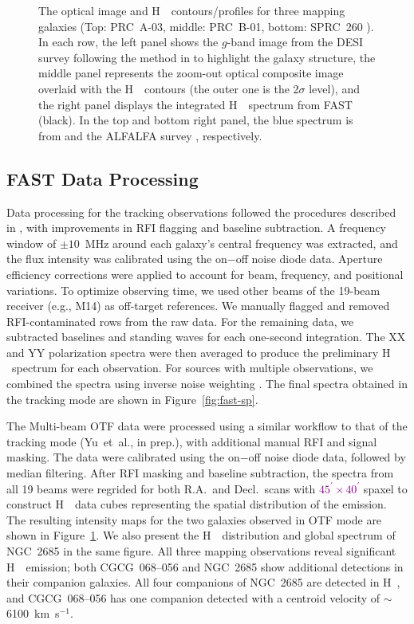 \documentclass[twocolumn]{aastex631}
\newcommand{\kms}{km~s$^{-1}$}
\def\HI{H\,  {\textsc{\romannumeral 1}}}
\begin{document}
\begin{figure}
\caption{
The optical image and \HI\ contours/profiles for three mapping galaxies (Top: PRC~A-03, middle: PRC~B-01, bottom: SPRC~260
).
In each row, the left panel shows the $g$-band image from the DESI survey \citep{Dey2019AJ....157..168D} following the method in \citet{Akhlaghi2015ApJS..220....1A} to highlight the galaxy structure, the middle panel represents the zoom-out optical composite image overlaid with the \HI\ contours (the outer one is the 2$\sigma$ level), and the right panel displays the integrated \HI\ spectrum from FAST (black). In the top and bottom right panel, the blue spectrum is from \citet{Peterson1974AJ.....79..767P} and the ALFALFA survey \citep{Haynes2018ApJ...861...49H}, respectively.
}
\label{fig:fast-mapping}
\end{figure}

\subsection{FAST Data Processing}
\label{sec:reduction}

Data processing for the tracking observations followed the procedures described in \citet{Yu2024SCPMA..6799811Y}, with improvements in RFI flagging and baseline subtraction. A frequency window of $\pm10$~MHz around each galaxy's central frequency was extracted, and the flux intensity was calibrated using the on$-$off noise diode data. Aperture efficiency corrections were applied to account for beam, frequency, and positional variations. To optimize observing time, we used other beams of the 19-beam receiver (e.g., M14) as off-target references. We manually flagged and removed RFI-contaminated rows from the raw data. For the remaining data, we subtracted baselines and standing waves for each one-second integration. The XX and YY polarization spectra were then averaged to produce the preliminary \HI\ spectrum for each observation. For sources with multiple observations, we combined the spectra using inverse noise weighting \citep{Fabello2011MNRAS.411..993F, Brown2015MNRAS.452.2479B}. The final spectra obtained in the tracking mode are shown in Figure~\ref{fig:fast-sp}.

The Multi-beam OTF data were processed using a similar workflow to that of the tracking mode (Yu~et~al., in prep.), with additional manual RFI and signal masking. The data were calibrated using the on$-$off noise diode data, followed by median filtering. After RFI masking and baseline subtraction, the spectra from all 19 beams were regrided for both R.A.\ and Decl.\ scans with \textcolor{purple}{$45^{\prime}\times 40^{\prime}$} spaxel to construct \HI\ data cubes representing the spatial distribution of the emission. The resulting intensity maps for the two galaxies observed in OTF mode are shown in Figure~\ref{fig:fast-mapping}. We also present the \HI\ distribution and global spectrum of NGC~2685 in the same figure. All three mapping observations reveal significant \HI\ emission; both CGCG~068--056 and NGC~2685 show additional detections in their companion galaxies. All four companions of NGC~2685 are detected in \HI, and CGCG~068--056 has one companion detected with a centroid velocity of $\sim$6100~\kms.
\end{document}
